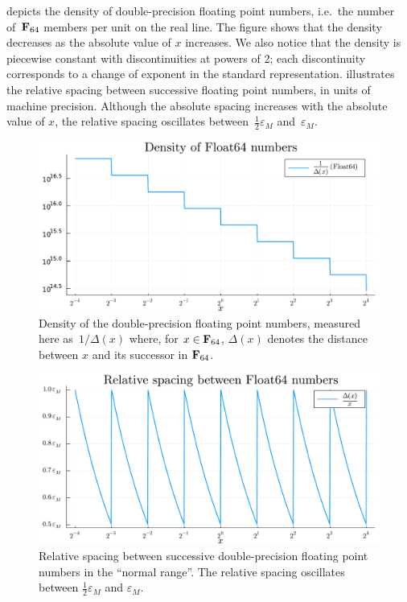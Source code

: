  depicts the density of double-precision floating point numbers,
i.e.\ the number of~$\mathbf F_{64}$ members per unit on the real line.
The figure shows that the density decreases as the absolute value of $x$ increases.
We also notice that the density is piecewise constant with discontinuities at powers of 2;
each discontinuity corresponds to a change of exponent in the standard representation.
 illustrates the relative spacing between successive floating point numbers,
in units of machine precision.
Although the absolute spacing increases with the absolute value of $x$,
the relative spacing oscillates between~$\frac{1}{2} \varepsilon_{M}$ and~$\varepsilon_M$.

\begin{figure}
    \centering
    \includegraphics[width=.8\textwidth]{figures/float64_density.pdf}
    \caption{%
        Density of the double-precision floating point numbers,
        measured here as~$1/\Delta(x)$ where,
        for $x \in \mathbf F_{64}$,
        $\Delta(x)$ denotes the distance between $x$ and its successor in $\mathbf F_{64}$.
    }%
    \label{fig:float64_density}%
\end{figure}

\begin{figure}[ht]
    \centering
    \includegraphics[width=.8\textwidth]{figures/float64_spacing.pdf}
    \caption{%
        Relative spacing between successive double-precision floating point numbers in the ``normal range''.
        The relative spacing oscillates between $\frac{1}{2} \varepsilon_M$ and $\varepsilon_M$.
    }%
    \label{fig:float64_spacing}
\end{figure}

